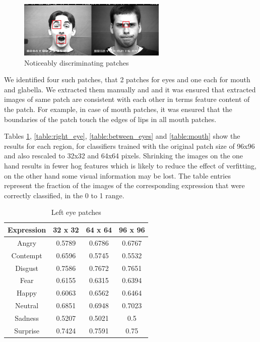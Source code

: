 \begin{figure}
\centering
\includegraphics[width=200pt]{img/manual_patch.png}
  \caption{Noticeably discriminating patches}
  \label{fig:manual_patch}
\end{figure}

We identified four such patches, that 2 patches for eyes and one each for mouth and glabella. We extracted them manually and and it was ensured that extracted images of same patch are consistent with each other in terms feature content of the patch. For example, in case of mouth patches, it was ensured that the boundaries of the patch touch the edges of lips in all mouth patches.

Tables \ref{table:left_eye}, \ref{table:right_eye}, \ref{table:between_eyes} and \ref{table:mouth} show the results for each region, for classifiers trained 
with the original patch size of 96x96 and also rescaled to 32x32 and 64x64 pixels. Shrinking the images on the one hand results in fewer hog features which is likely to reduce the effect of  verfitting, on the other hand some visual information may be lost. The table entries represent the fraction of the images of the corresponding expression that were correctly classified, in the 0 to 1 range.




\begin{table}
\caption{Left eye patches}
\label{table:left_eye}

\begin{tabular}{| c | c | c | c |}
\hline
Expression & 32 x 32 &  64 x 64  & 96 x 96  \\

\hline
Angry & 0.5789 & 0.6786 & 0.6767 \\
Contempt & 0.6596 &	0.5745 & 0.5532 \\
Disgust	& 0.7586 &	0.7672 &	0.7651 \\
Fear &	0.6155 & 0.6315 & 0.6394 \\ 
Happy &	0.6063 & 0.6562 & 0.6464 \\ 
Neutral & 0.6851 &	0.6948 & 0.7023 \\
Sadness & 0.5207 & 0.5021 &	0.5 \\
Surprise & 0.7424 &	0.7591 & 0.75 \\

\hline
\end{tabular}
\end{table}

